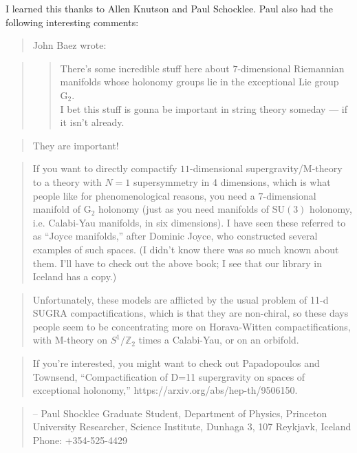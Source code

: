 \documentclass{article}
\begin{document}
I learned this thanks to Allen Knutson and Paul Schocklee. Paul also had
the following interesting comments:

\begin{quote}
John Baez wrote:
\end{quote}

\begin{quote}
\begin{quote}
There's some incredible stuff here about \(7\)-dimensional Riemannian
manifolds whose holonomy groups lie in the exceptional Lie group
\(\mathrm{G}_2\).\\
I bet this stuff is gonna be important in string theory someday --- if
it isn't already.
\end{quote}
\end{quote}

\begin{quote}
They are important!
\end{quote}

\begin{quote}
If you want to directly compactify \(11\)-dimensional
supergravity/M-theory to a theory with \(N=1\) supersymmetry in 4
dimensions, which is what people like for phenomenological reasons, you
need a \(7\)-dimensional manifold of \(\mathrm{G}_2\) holonomy (just as
you need manifolds of \(\mathrm{SU}(3)\) holonomy, i.e. Calabi-Yau
manifolds, in six dimensions). I have seen these referred to as ``Joyce
manifolds,'' after Dominic Joyce, who constructed several examples of
such spaces. (I didn't know there was so much known about them. I'll
have to check out the above book; I see that our library in Iceland has
a copy.)
\end{quote}

\begin{quote}
Unfortunately, these models are afflicted by the usual problem of 11-d
SUGRA compactifications, which is that they are non-chiral, so these
days people seem to be concentrating more on Horava-Witten
compactifications, with M-theory on \(S^1/\mathbb{Z}_2\) times a
Calabi-Yau, or on an orbifold.
\end{quote}

\begin{quote}
If you're interested, you might want to check out Papadopoulos and
Townsend, ``Compactification of D=11 supergravity on spaces of
exceptional holonomy,'' https://arxiv.org/abs/hep-th/9506150.
\end{quote}

\begin{quote}
-- Paul Shocklee Graduate Student, Department of Physics, Princeton
University Researcher, Science Institute, Dunhaga 3, 107 Reykjavk,
Iceland Phone: +354-525-4429
\end{quote}
\end{document}
